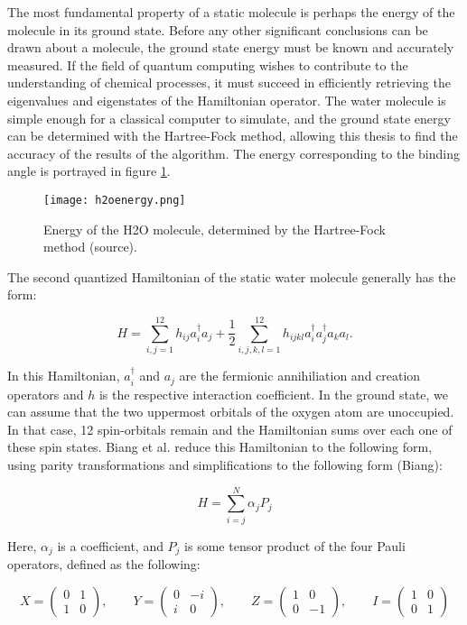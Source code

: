 \documentclass{article}
\begin{document}
The most fundamental property of a static molecule is perhaps the energy of the  molecule in its ground state. Before any other significant conclusions can be drawn about a molecule, the ground state energy must be known and accurately measured. If the field of quantum computing wishes to contribute to the understanding of chemical processes, it must succeed in efficiently retrieving the eigenvalues and eigenstates of the Hamiltonian operator. The water molecule is simple enough for a classical computer to simulate, and the ground state energy can be determined with the Hartree-Fock method, allowing this thesis to find the accuracy of the results of the algorithm. The energy corresponding to the binding angle is portrayed in figure \ref{h2o}. 

\begin{figure}[htbp]
    \centering
    \texttt{[image: h2oenergy.png]}
    \caption{Energy of the H2O molecule, determined by the Hartree-Fock method (source).}
    \label{h2o}
\end{figure}

The second quantized Hamiltonian of the static water molecule generally has the form:

$$
H=\sum_{i, j=1}^{12} h_{i j} a_{i}^{\dagger} a_{j}+\frac{1}{2} \sum_{i, j, k, l=1}^{12} h_{i j k l} a_{i}^{\dagger} a_{j}^{\dagger} a_{k} a_{l}.
$$

In this Hamiltonian, $ a_{i}^{\dagger}$ and $a_{j}$ are the fermionic annihiliation and creation operators and $ h $ is the respective interaction coefficient. In the ground state, we can assume that the two uppermost orbitals of the oxygen atom are unoccupied. In that case, 12 spin-orbitals remain and the Hamiltonian sums over each one of these spin states.
Biang et al. reduce this Hamiltonian to the following form, using parity transformations and simplifications to the following form (Biang):

$$
H=\sum_{i=j}^{N} \alpha_{j} P_{j}
$$

Here, $\alpha_{j}$ is a coefficient, and $ P_{j}$ is some tensor product of the four Pauli operators, defined as the following:

$$
X=\left(\begin{array}{cc}
0 & 1 \\
1 & 0
\end{array}\right), \quad \quad Y=\left(\begin{array}{cc}
0 & -i \\
i & 0
\end{array}\right), \quad \quad Z=\left(\begin{array}{cc}
1 & 0 \\
0 & -1
\end{array}\right),\quad \quad I=\left(\begin{array}{cc}
1 & 0 \\
0 & 1
\end{array}\right)
$$
\end{document}

